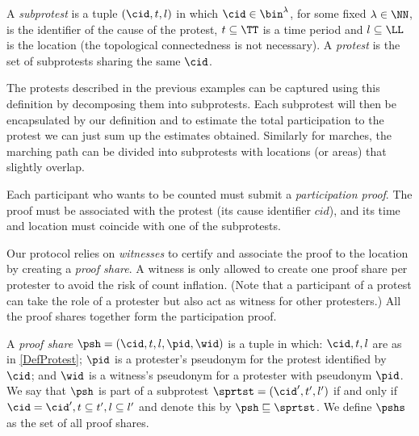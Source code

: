 \begin{definition}\label{DefProtest}
  A \emph{subprotest} is a tuple \((\cid, t, l)\) in which \(\cid\in \bin^{\lambda}\), for some fixed \(\lambda\in \NN\), is the identifier of the cause of the protest, \(t \subseteq \TT\) is a time period and \(l \subseteq \LL\) is the location (the topological connectedness is not necessary).
  A \emph{protest} is the set of subprotests sharing the same \(\cid\).
\end{definition}

The protests described in the previous examples can be captured using this definition by decomposing them into subprotests.
Each subprotest will then be encapsulated by our definition and to estimate the total participation to the protest we can just sum up the estimates obtained.
Similarly for marches, the marching path can be divided into subprotests with locations (or areas) that slightly overlap.

Each participant who wants to be counted must submit a \emph{participation proof}.
The proof must be associated with the protest (\ie its cause identifier \(cid\)), and its time and location must coincide with one of the subprotests.

Our protocol relies on \emph{witnesses} to certify and associate the proof to the location by creating a \emph{proof share}.
A witness is only allowed to create one proof share per protester to avoid the risk of count inflation.
(Note that a participant of a protest can take the role of a protester but also 
act as witness for other protesters.)
All the proof shares together form the participation proof.


\begin{definition}%
  \label{DefProofShare}\label{DefProofShares}
  A \emph{proof share} \(\psh = (\cid, t, l, \pid, \wid)\) is a tuple in which: 
  \(\cid, t, l\) are as in \cref{DefProtest};
  \(\pid\) is a protester's pseudonym for the protest identified by \(\cid\); and \(\wid\) is a witness's pseudonym for a protester with pseudonym \(\pid\).
  We say that \(\psh\) is part of a subprotest \(\sprtst = (\cid', t', l')\) if and only if \(\cid = \cid', t\subseteq t', l\subseteq l'\) and denote this by 
  \(\psh \sqsubseteq \sprtst\).
  We define \(\pshs\) as the set of all proof shares.
\end{definition}

